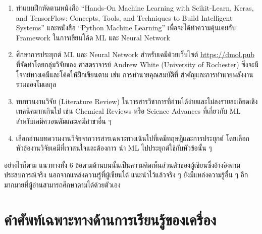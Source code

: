 \begin{enumerate}
    \noindent และคอร์สของ Stanford University ซึ่งมีศาสตราจารย์ Andrew Ng นำทีมสอนเช่นเดียวกัน
    \begin{enumerate}
        \item CS229: Machine Learning%
        \footnote{\url{https://cs229.stanford.edu}}
        \item CS230: Deep Learning%
        \footnote{\url{https://cs230.stanford.edu}}
    \end{enumerate}

    
    \item ทำแบบฝึกหัดตามหนังสือ \enquote{Hands-On Machine Learning with Scikit-Learn, Keras, and TensorFlow: 
    Concepts, Tools, and Techniques to Build Intelligent Systems} และหนังสือ \enquote{Python Machine Learning} 
    เพื่อจะได้ทำความคุ้นเคยกับ Framework ในการเขียนโค้ด ML และ Neural Network
    
    \item ศึกษาการประยุกต์ ML และ Neural Network สำหรับเคมีด้วยเว็บไซต์ \url{https://dmol.pub} ที่จัดทำโดยกลุ่มวิจัยของ%
    ศาสตราจารย์ Andrew White (University of Rochester) ซึ่งจะมีโจทย์ทางเคมีและโค้ดให้ฝึกเขียนตาม เช่น การทำนายคุณสมบัติที่%
    สำคัญและการทำนายพลังงานรวมของโมเลกุล
    
    \item ทบทวนงานวิจัย (Literature Review) ในวารสารวิชาการที่อ่านได้ง่ายและไม่ลงรายละเอียดเชิงเทคนิคมากเกินไป เช่น Chemical 
    Reviews หรือ Science Advances ที่เกี่ยวกับ ML สำหรับเคมีควอนตัมและเคมีสาขาอื่น ๆ
    
    \item เลือกอ่านบทความงานวิจัยจากวารสารเฉพาะทางเน้นไปที่เคมีทฤษฎีและการประยุกต์ โดยเลือกหัวข้องานวิจัยเคมีที่เราสนใจและต้องการ%
    นำ ML ไปประยุกต์ใช้กับหัวข้อนั้น ๆ
\end{enumerate}

อย่างไรก็ตาม แนวทางทั้ง 6 ข้อตามด้านบนนั้นเป็นความคิดเห็นส่วนตัวของผู้เขียนซึ่งอ้างอิงตามประสบการณ์จริง นอกจากแหล่งความรู้ที่ผู้เขียนได้%
แนะนำไว้แล้วจริง ๆ ยังมีแหล่งความรู้อื่น ๆ อีกมากมายที่ผู้อ่านสามารถศึกษาตามได้ด้วยตัวเอง

\section{คำศัพท์เฉพาะทางด้านการเรียนรู้ของเครื่อง}
\label{sec:ml_term}

